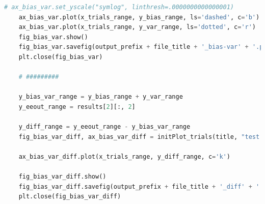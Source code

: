 \documentclass[12pt]{article}
\begin{document}
\begin{lstlisting}[language=Python, caption=experiment\_printer.py]
    # ax_bias_var.set_yscale("symlog", linthresh=.0000000000000001)
    ax_bias_var.plot(x_trials_range, y_bias_range, ls='dashed', c='b')
    ax_bias_var.plot(x_trials_range, y_var_range, ls='dotted', c='r')
    fig_bias_var.show()
    fig_bias_var.savefig(output_prefix + file_title + '_bias-var' + '.png', transparent=False, dpi=80, bbox_inches="tight")
    plt.close(fig_bias_var)

    # #########

    y_bias_var_range = y_bias_range + y_var_range
    y_eeout_range = results[2][:, 2]

    y_diff_range = y_eeout_range - y_bias_var_range
    fig_bias_var_diff, ax_bias_var_diff = initPlot_trials(title, "test data points", "E[E_out] - bias + var ", x_trials_range, y_diff_range, "log", "linear")

    ax_bias_var_diff.plot(x_trials_range, y_diff_range, c='k')

    fig_bias_var_diff.show()
    fig_bias_var_diff.savefig(output_prefix + file_title + '_diff' + '.png', transparent=False, dpi=80, bbox_inches="tight")
    plt.close(fig_bias_var_diff)
    
\end{lstlisting}
\end{document}
